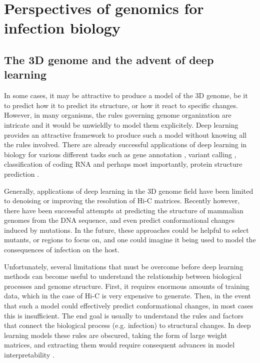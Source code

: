 
\chapter{Perspectives of genomics for infection biology} %

\label{ch:03-02} %


\section{The 3D genome and the advent of deep learning}
In some cases, it may be attractive to produce a model of the 3D genome, be it to predict how it to predict its structure, or how it react to specific changes. However, in many organisms, the rules governing genome organization are intricate and it would be unwieldly to model them explicitely. Deep learning provides an attractive framework to produce such a model without knowing all the rules involved. There are already successful applications of deep learning in biology for various different tasks such as gene annotation \cite{stiehlerHelixerCrossspeciesGene2020}, variant calling \cite{poplinUniversalSNPSmallindel2018}, classification of coding RNA \cite{hillDeepRecurrentNeural2018} and perhaps most importantly, protein structure prediction \cite{jumperHighlyAccurateProtein2021}.

Generally, applications of deep learning in the 3D genome field have been limited to denoising or improving the resolution of Hi-C matrices. Recently however, there have been successful attempts at predicting the structure of mammalian genomes from the DNA sequence, and even predict conformational changes induced by mutations. In the future, these approaches could be helpful to select mutants, or regions to focus on, and one could imagine it being used to model the consequences of infection on the host.

Unfortunately, several limitations that must be overcome before deep learning methods can become useful to understand the relationship between biological processes and genome structure. First, it requires enormous amounts of training data, which in the case of Hi-C is very expensive to generate. Then, in the event that such a model could effectively predict conformational changes, in most cases this is insufficient. The end goal is usually to understand the rules and factors that connect the biological process (e.g. infection) to structural changes. In deep learning models these rules are obscured, taking the form of large weight matrices, and extracting them would require consequent advances in model interpretability \cite{talukderInterpretationDeepLearning2021}.

